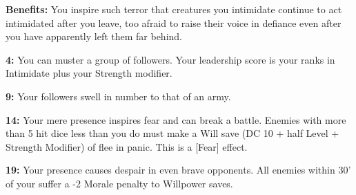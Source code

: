 \textbf{Benefits:} You inspire such terror that creatures you intimidate continue to act intimidated after you leave, too afraid to raise their voice in defiance even after you have apparently left them far behind.

\textbf{4:} You can muster a group of followers. Your leadership score is your ranks in Intimidate plus your Strength modifier.

\textbf{9:} Your followers swell in number to that of an army.

\textbf{14:} Your mere presence inspires fear and can break a battle. Enemies with more than 5 hit dice less than you do must make a Will save (DC 10 + half Level + Strength Modifier) of flee in panic. This is a [Fear] effect.

\textbf{19:} Your presence causes despair in even brave opponents. All enemies within 30' of your suffer a -2 Morale penalty to Willpower saves.
